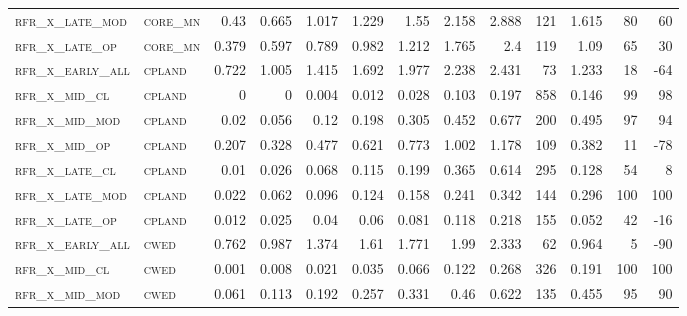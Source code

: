 \begin{landscape}
\begin{center}
\begin{footnotesize}
\begin{longtable}{llrrrrrrrr|rrr}
\textsc{rfr\_x\_late\_mod } & \textsc{core\_mn  }   & 0.43    & 0.665   & 1.017   & 1.229    & 1.55     & 2.158    & 2.888    & 121    & 1.615         & 80            & 60              \\
\textsc{rfr\_x\_late\_op  } & \textsc{core\_mn  }   & 0.379   & 0.597   & 0.789   & 0.982    & 1.212    & 1.765    & 2.4      & 119    & 1.09          & 65            & 30              \\
\textsc{rfr\_x\_early\_all} & \textsc{cpland    }   & 0.722   & 1.005   & 1.415   & 1.692    & 1.977    & 2.238    & 2.431    & 73     & 1.233         & 18            & -64             \\
\textsc{rfr\_x\_mid\_cl   } & \textsc{cpland    }   & 0       & 0       & 0.004   & 0.012    & 0.028    & 0.103    & 0.197    & 858    & 0.146         & 99            & 98              \\
\textsc{rfr\_x\_mid\_mod  } & \textsc{cpland    }   & 0.02    & 0.056   & 0.12    & 0.198    & 0.305    & 0.452    & 0.677    & 200    & 0.495         & 97            & 94              \\
\textsc{rfr\_x\_mid\_op   } & \textsc{cpland    }   & 0.207   & 0.328   & 0.477   & 0.621    & 0.773    & 1.002    & 1.178    & 109    & 0.382         & 11            & -78             \\
\textsc{rfr\_x\_late\_cl  } & \textsc{cpland    }   & 0.01    & 0.026   & 0.068   & 0.115    & 0.199    & 0.365    & 0.614    & 295    & 0.128         & 54            & 8               \\
\textsc{rfr\_x\_late\_mod } & \textsc{cpland    }   & 0.022   & 0.062   & 0.096   & 0.124    & 0.158    & 0.241    & 0.342    & 144    & 0.296         & 100           & 100             \\
\textsc{rfr\_x\_late\_op  } & \textsc{cpland    }   & 0.012   & 0.025   & 0.04    & 0.06     & 0.081    & 0.118    & 0.218    & 155    & 0.052         & 42            & -16             \\
\textsc{rfr\_x\_early\_all} & \textsc{cwed      }   & 0.762   & 0.987   & 1.374   & 1.61     & 1.771    & 1.99     & 2.333    & 62     & 0.964         & 5             & -90             \\
\textsc{rfr\_x\_mid\_cl   } & \textsc{cwed      }   & 0.001   & 0.008   & 0.021   & 0.035    & 0.066    & 0.122    & 0.268    & 326    & 0.191         & 100           & 100             \\
\textsc{rfr\_x\_mid\_mod  } & \textsc{cwed      }   & 0.061   & 0.113   & 0.192   & 0.257    & 0.331    & 0.46     & 0.622    & 135    & 0.455         & 95            & 90              \\

\end{longtable}
\end{footnotesize}
\end{center}
\end{landscape}
